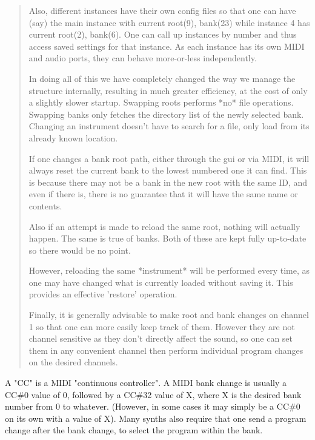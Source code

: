 \begin{quotation}
      Also, different instances have their own config files so that one can
      have (say) the main instance with current root(9), bank(23) while
      instance 4 has current root(2), bank(6). One can call up instances by
      number and thus access saved settings for that instance. As each instance
      has its own MIDI and audio ports, they can behave more-or-less
      independently.

      In doing all of this we have completely changed the way we manage the
      structure internally, resulting in much greater efficiency, at the cost
      of only a slightly slower startup. Swapping roots performs *no* file
      operations. Swapping banks only fetches the directory list of the newly
      selected bank. Changing an instrument doesn't have to search for a file,
      only load from its already known location.

      If one changes a bank root path, either through the gui or via MIDI, it
      will always reset the current bank to the lowest numbered one it can
      find. This is because there may not be a bank in the new root with the
      same ID, and even if there is, there is no guarantee that it will have
      the same name or contents.

      Also if an attempt is made to reload the same root, nothing will actually
      happen. The same is true of banks. Both of these are kept fully
      up-to-date so there would be no point.

      However, reloading the same *instrument* will be performed every time, as
      one may have changed what is currently loaded without saving it. This
      provides an effective 'restore' operation.

      Finally, it is generally advisable to make root and bank changes on
      channel 1 so that one can more easily keep track of them. However they
      are not channel sensitive as they don't directly affect the sound, so one
      can set them in any convenient channel then perform individual program
      changes on the desired channels.
   \end{quotation}

   A "CC" is a MIDI "continuous controller".
   A MIDI bank change is usually a CC\#0 value of 0, followed by a CC\#32
   value of X, where X is the desired bank number from 0 to whatever.
   (However, in some cases it may simply be a CC\#0 on its own with a value
    of X).  Many synths also require that one send a program change after
   the bank change, to select the program within the bank. 

